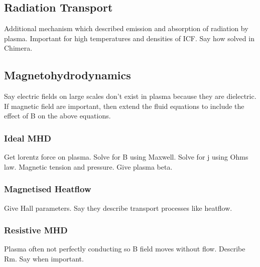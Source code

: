 \subsection{Radiation Transport}%
\label{sec:theory_radtransp}

Additional mechanism which described emission and absorption of radiation by plasma.
Important for high temperatures and densities of ICF.
Say how solved in Chimera.

\subsection{Magnetohydrodynamics}%
\label{sec:theory_MHD}

Say electric fields on large scales don't exist in plasma because they are dielectric.
If magnetic field are important, then extend the fluid equations to include the effect of B on the above equations.

\subsubsection{Ideal MHD}%
\label{sec:theory_idealMHD}

Get lorentz force on plasma.
Solve for B using Maxwell.
Solve for j using Ohms law.
Magnetic tension and pressure.
Give plasma beta.

\subsubsection{Magnetised Heatflow}%
\label{sec:theory_magheatflow}

Give Hall parameters.
Say they describe transport processes like heatflow.

\subsubsection{Resistive MHD}%
\label{sec:theory_resisMHD}

Plasma often not perfectly conducting so B field moves without flow.
Describe Rm.
Say when important.

